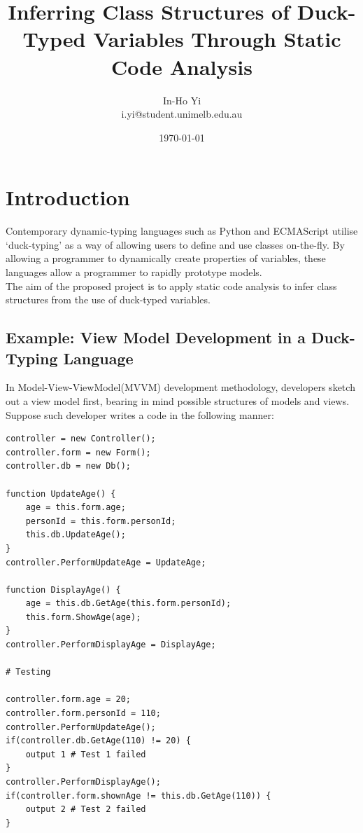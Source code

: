 \documentclass[a4paper,12pt]{article}
\begin{document}
\title{Inferring Class Structures of Duck-Typed Variables Through Static Code Analysis}
\author{In-Ho Yi\\
i.yi@student.unimelb.edu.au
}
\date{\today}
\maketitle
\section{Introduction}
Contemporary dynamic-typing languages such as Python and ECMAScript utilise `duck-typing' as a way of allowing users to define and use classes on-the-fly. By allowing a programmer to dynamically create properties of variables, these languages allow a programmer to rapidly prototype models.\\
The aim of the proposed project is to apply static code analysis to infer class structures from the use of duck-typed variables.\\

\subsection{Example: View Model Development in a Duck-Typing Language}
In Model-View-ViewModel(MVVM) development methodology, developers sketch out a view model first, bearing in mind possible structures of models and views. Suppose such developer writes a code in the following manner:\\
\begin{lstlisting}[caption=Controller written in a Duck-Typing language]
controller = new Controller();
controller.form = new Form();
controller.db = new Db();

function UpdateAge() {
	age = this.form.age;
	personId = this.form.personId;
	this.db.UpdateAge();
}
controller.PerformUpdateAge = UpdateAge;

function DisplayAge() {
	age = this.db.GetAge(this.form.personId);
	this.form.ShowAge(age);
}
controller.PerformDisplayAge = DisplayAge;

# Testing

controller.form.age = 20;
controller.form.personId = 110;
controller.PerformUpdateAge();
if(controller.db.GetAge(110) != 20) {
	output 1 # Test 1 failed
}
controller.PerformDisplayAge();
if(controller.form.shownAge != this.db.GetAge(110)) {
	output 2 # Test 2 failed
}
\end{lstlisting}
\end{document}

